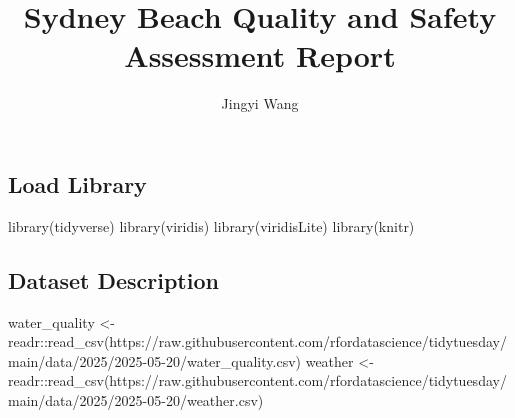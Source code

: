 \documentclass[
  11pt,
]{article}
\title{Sydney Beach Quality and Safety Assessment Report}
\author{Jingyi Wang}
\date{}
\newenvironment{Shaded}{\begin{snugshade}}{\end{snugshade}}
\newcommand{\FunctionTok}[1]{\textcolor[rgb]{0.28,0.35,0.67}{#1}}
\newcommand{\NormalTok}[1]{\textcolor[rgb]{0.00,0.23,0.31}{#1}}
\newcommand{\OtherTok}[1]{\textcolor[rgb]{0.00,0.23,0.31}{#1}}
\newcommand{\SpecialCharTok}[1]{\textcolor[rgb]{0.37,0.37,0.37}{#1}}
\newcommand{\StringTok}[1]{\textcolor[rgb]{0.13,0.47,0.30}{#1}}
\renewcommand*\contentsname{Table of contents}
\newcommand\contentsname{Table of contents}
\begin{document}
\maketitle

\renewcommand*\contentsname{Table of contents}
{
\hypersetup{linkcolor=}
\setcounter{tocdepth}{3}
\tableofcontents
}

\subsection{Load Library}\label{load-library}

\begin{Shaded}
\begin{Highlighting}[]
\FunctionTok{library}\NormalTok{(tidyverse)}
\FunctionTok{library}\NormalTok{(viridis)}
\FunctionTok{library}\NormalTok{(viridisLite)}
\FunctionTok{library}\NormalTok{(knitr)}
\end{Highlighting}
\end{Shaded}

\subsection{Dataset Description}\label{dataset-description}

\begin{Shaded}
\begin{Highlighting}[]
\NormalTok{water\_quality }\OtherTok{\textless{}{-}}\NormalTok{ readr}\SpecialCharTok{::}\FunctionTok{read\_csv}\NormalTok{(}\StringTok{\textquotesingle{}https://raw.githubusercontent.com/rfordatascience/tidytuesday/main/data/2025/2025{-}05{-}20/water\_quality.csv\textquotesingle{}}\NormalTok{)}
\NormalTok{weather }\OtherTok{\textless{}{-}}\NormalTok{ readr}\SpecialCharTok{::}\FunctionTok{read\_csv}\NormalTok{(}\StringTok{\textquotesingle{}https://raw.githubusercontent.com/rfordatascience/tidytuesday/main/data/2025/2025{-}05{-}20/weather.csv\textquotesingle{}}\NormalTok{)}
\end{Highlighting}
\end{Shaded}
\end{document}
